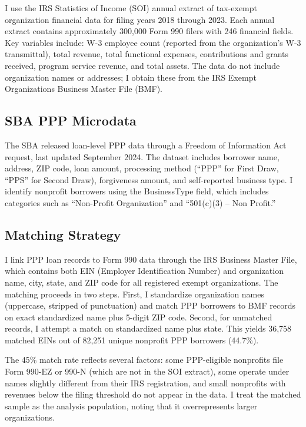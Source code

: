 \documentclass[12pt]{article}
\begin{document}
I use the IRS Statistics of Income (SOI) annual extract of tax-exempt organization financial data for filing years 2018 through 2023. Each annual extract contains approximately 300,000 Form 990 filers with 246 financial fields. Key variables include: W-3 employee count (reported from the organization's W-3 transmittal), total revenue, total functional expenses, contributions and grants received, program service revenue, and total assets. The data do not include organization names or addresses; I obtain these from the IRS Exempt Organizations Business Master File (BMF).

\subsection{SBA PPP Microdata}

The SBA released loan-level PPP data through a Freedom of Information Act request, last updated September 2024. The dataset includes borrower name, address, ZIP code, loan amount, processing method (``PPP'' for First Draw, ``PPS'' for Second Draw), forgiveness amount, and self-reported business type. I identify nonprofit borrowers using the BusinessType field, which includes categories such as ``Non-Profit Organization'' and ``501(c)(3) -- Non Profit.''

\subsection{Matching Strategy}

I link PPP loan records to Form 990 data through the IRS Business Master File, which contains both EIN (Employer Identification Number) and organization name, city, state, and ZIP code for all registered exempt organizations. The matching proceeds in two steps. First, I standardize organization names (uppercase, stripped of punctuation) and match PPP borrowers to BMF records on exact standardized name plus 5-digit ZIP code. Second, for unmatched records, I attempt a match on standardized name plus state. This yields 36,758 matched EINs out of 82,251 unique nonprofit PPP borrowers (44.7\%).

The 45\% match rate reflects several factors: some PPP-eligible nonprofits file Form 990-EZ or 990-N (which are not in the SOI extract), some operate under names slightly different from their IRS registration, and small nonprofits with revenues below the filing threshold do not appear in the data. I treat the matched sample as the analysis population, noting that it overrepresents larger organizations.
\end{document}
